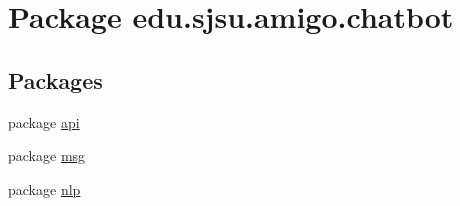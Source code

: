 \hypertarget{namespaceedu_1_1sjsu_1_1amigo_1_1chatbot}{}\section{Package edu.\+sjsu.\+amigo.\+chatbot}
\label{namespaceedu_1_1sjsu_1_1amigo_1_1chatbot}
\subsection*{Packages}
\begin{DoxyCompactItemize}
\item 
package \hyperlink{namespaceedu_1_1sjsu_1_1amigo_1_1chatbot_1_1api}{api}
\item 
package \hyperlink{namespaceedu_1_1sjsu_1_1amigo_1_1chatbot_1_1msg}{msg}
\item 
package \hyperlink{namespaceedu_1_1sjsu_1_1amigo_1_1chatbot_1_1nlp}{nlp}
\end{DoxyCompactItemize}
